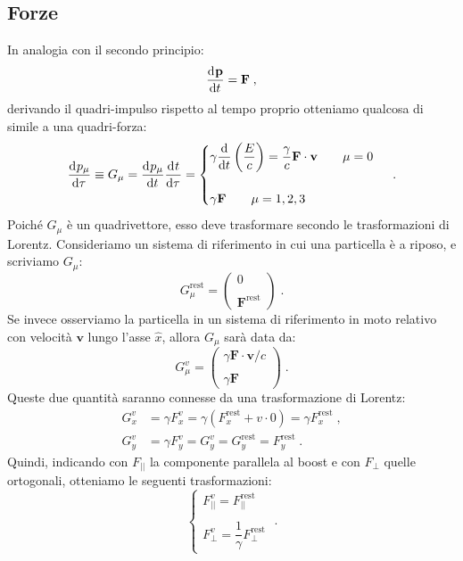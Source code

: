 \subsection{Forze}
In analogia con il secondo principio:
\begin{equation}
\frac{\mathrm{d}^{}\mathbf{p}}{\mathrm{d}t^{}}=\mathbf{F}\;,
\end{equation}
derivando il quadri-impulso rispetto al tempo proprio otteniamo qualcosa di simile a una quadri-forza:
\begin{equation}
\frac{\mathrm{d}^{}p_{\mu}}{\mathrm{d}\tau^{}}\equiv G_{\mu}=\frac{\mathrm{d}^{}p_{\mu}}{\mathrm{d}t^{}}\frac{\mathrm{d}^{}t}{\mathrm{d}\tau^{}}=\begin{cases}
\gamma\dfrac{\mathrm{d}}{\mathrm{d}{t}}\left(\dfrac{E}{c}\right)=\dfrac{\gamma}{c}\mathbf{F}\cdot\mathbf{v}\qquad \mu=0 \\
\\
\gamma\mathbf{F}\qquad \mu=1,2,3
\end{cases}\;.
\end{equation}
Poiché $G_{\mu}$ è un quadrivettore, esso deve trasformare secondo le trasformazioni di Lorentz. Consideriamo un sistema di riferimento in cui una particella è a riposo, e scriviamo $G_{\mu}$:
\begin{equation}
G^{\mathrm{rest}}_{\mu}=\begin{pmatrix}
0 \\
\\
\mathbf{F}^{\mathrm{rest}}
\end{pmatrix}\;.
\end{equation}
Se invece osserviamo la particella in un sistema di riferimento in moto relativo con velocità $\mathbf{v}$ lungo l'asse $\hat{x}$, allora 
$G_{\mu}$ sarà data da:
\begin{equation}
G^v_{\mu}=\begin{pmatrix}
\gamma\mathbf{F}\cdot\mathbf{v}/c \\
\\
\gamma\mathbf{F}
\end{pmatrix}\;.
\end{equation}
Queste due quantità saranno connesse da una trasformazione di Lorentz: 
\begin{align}
G_x^v &=\gamma F_x^v=\gamma(F_x^{\mathrm{rest}}+v\cdot 0)=\gamma F_x^{\mathrm{rest}}\;, \\
G_y^v &= \gamma F_y^v=G_y^v=G_y^{\mathrm{rest}}=F_y^{\mathrm{rest}}\;.
\end{align}
Quindi, indicando con $F_{||}$ la componente parallela al boost e con $F_{\perp}$ quelle ortogonali, otteniamo le seguenti trasformazioni:
\begin{equation}
 \begin{cases}
  F_{||}^v=F_{||}^{\mathrm{rest}} \\
\\
F_{\perp}^v =\dfrac{1}{\gamma} F_{\perp}^{\mathrm{rest}}
 \end{cases}\;.
\end{equation}
